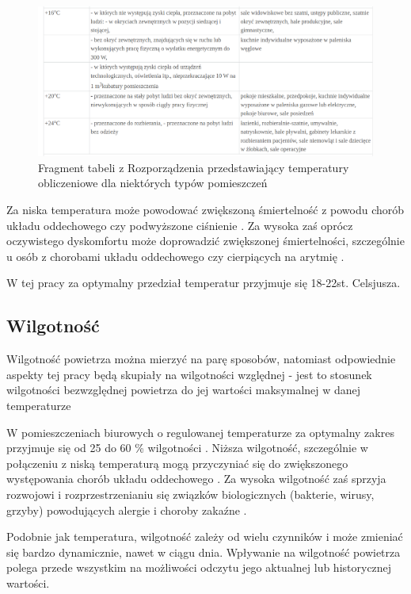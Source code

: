 \begin{figure}[H]
    \caption{Fragment tabeli z Rozporządzenia przedstawiający temperatury obliczeniowe dla niektórych typów pomieszczeń}
    \includegraphics[width=\textwidth]{zdj/min-tabela.png}
\end{figure}

Za niska temperatura może powodować zwiększoną śmiertelność z powodu chorób układu oddechowego czy podwyższone 
ciśnienie \cite{who-cold}. Za wysoka zaś oprócz oczywistego dyskomfortu może doprowadzić zwiększonej śmiertelności, 
szczególnie u osób z chorobami układu oddechowego czy cierpiących na arytmię \cite{bmj-heat}.

W tej pracy za optymalny przedział temperatur przyjmuje się 18-22st. Celsjusza.

\subsection{Wilgotność}

Wilgotność powietrza można mierzyć na parę sposobów, natomiast odpowiednie aspekty tej pracy będą 
skupiały na wilgotności względnej - jest to stosunek wilgotności bezwzględnej powietrza do jej wartości 
maksymalnej w danej temperaturze \cite{termodynamika}

W pomieszczeniach biurowych o regulowanej temperaturze za optymalny zakres przyjmuje się 
od 25 do 60 \% wilgotności \cite{inz-bud}. Niższa wilgotność, szczególnie w połączeniu z niską temperaturą 
mogą przyczyniać się do zwiększonego występowania chorób układu oddechowego \cite{low-hum}. Za wysoka wilgotność 
zaś sprzyja rozwojowi i rozprzestrzenianiu się związków biologicznych (bakterie, wirusy, grzyby) 
powodujących alergie i choroby zakaźne \cite{high-hum}.

Podobnie jak temperatura, wilgotność zależy od wielu czynników i może zmieniać się bardzo dynamicznie, 
nawet w ciągu dnia. Wpływanie na wilgotność powietrza polega przede wszystkim na możliwości odczytu 
jego aktualnej lub historycznej wartości.

